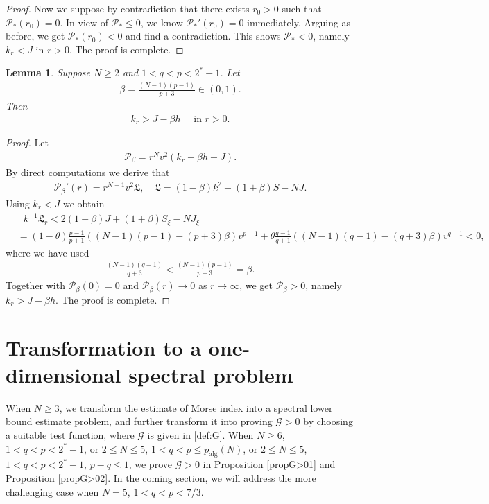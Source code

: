 \documentclass{article}
\newtheorem{lemma}[theorem]{Lemma}
\theoremstyle{definition} \theoremstyle{remark}
\numberwithin{equation}{section}
\newcommand{\G}{\mathcal{G}}
\newcommand{\p}{\mathcal{P}}
\begin{document}
\begin{proof}
		Now we suppose by contradiction that there exists $r_0 > 0$ such that $\p_*(r_0) = 0$. In view of $\p_* \le 0$, we know $\p_*'(r_0) = 0$ immediately. Arguing as before, we get $\p_*(r_0) < 0$ and find a contradiction. This shows $\p_* < 0$, namely $k_r < J$ in $r > 0$. The proof is complete.
	\end{proof}

	\begin{lemma} \label{lemsestimate}
		Suppose $N \ge 2$ and $1 < q < p < 2^* -1$. Let
		\begin{align} \label{def:beta}
			\beta = \frac{(N-1)(p-1)}{p+3} \in (0,1).
		\end{align}
		Then
		\begin{align} \label{usefulestimate2}
			k_r > J - \beta h \quad \text{ in } r > 0.
		\end{align}
	\end{lemma}

	\begin{proof}
		Let
		\begin{align*}
			\p_\beta = r^N v^2 (k_r + \beta h - J).
		\end{align*}
		By direct computations we derive that
		\begin{align*}
			\p_\beta'(r) = r^{N-1}v^2 \mathfrak{L}, \quad \mathfrak{L} = (1-\beta)k^2 + (1+\beta)S - NJ.
		\end{align*}
		Using $k_r < J$ we obtain
		\begin{align*}
			& ~~~ k^{-1}\mathfrak{L}_r  < 2(1-\beta)J + (1+\beta)S_\xi - N J_\xi \\
			& = (1-\theta)\frac{p-1}{p+1}\left((N-1)(p-1) - (p+3)\beta\right)v^{p-1} + \theta\frac{q-1}{q+1}\left((N-1)(q-1) - (q+3)\beta\right)v^{q-1} < 0,
		\end{align*}
		where we have used
		\begin{align*}
			\frac{(N-1)(q-1)}{q+3} < \frac{(N-1)(p-1)}{p+3} = \beta.
		\end{align*}
		Together with $\p_\beta(0) = 0$ and $\p_\beta(r) \to 0$ as $r \to \infty$, we get $\p_\beta > 0$, namely $k_r > J - \beta h$. The proof is complete.
	\end{proof}


	\section{Transformation to a one-dimensional spectral problem} \label{sectransformation}

	When $N \ge 3$, we transform the estimate of Morse index into a spectral lower bound estimate problem, and further transform it into proving $\G > 0$ by choosing a suitable test function, where $\G$ is given in \eqref{def:G}. When $N \ge 6$, $1 < q < p < 2^*-1$, or $2 \le N \le 5$, $1 < q < p \le p_{\text{alg}}(N)$, or $2 \le N \le 5$, $1 < q < p < 2^*-1$, $p - q \le 1$, we prove $\G > 0$ in Proposition \ref{propG>01} and Proposition \ref{propG>02}. In the coming section, we will address the more challenging case when $N = 5$, $1 < q < p < 7/3$.
\end{document}
